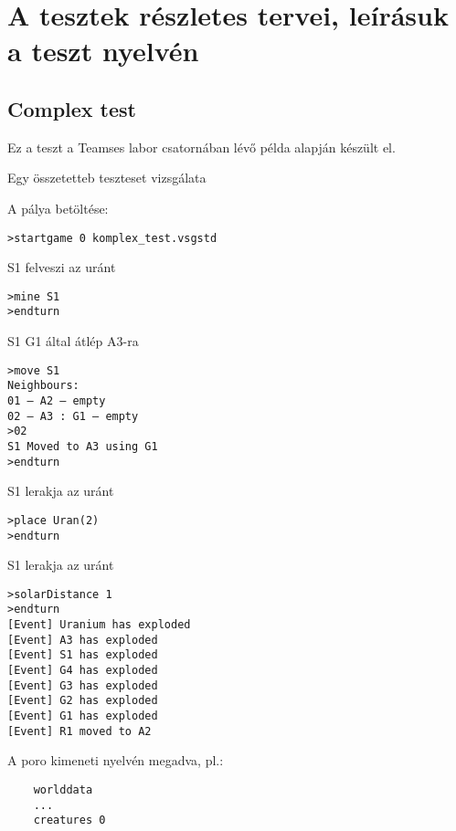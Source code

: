 \documentclass[../../projlab]{subfiles}
\begin{document}
\section{A tesztek részletes tervei, leírásuk a teszt nyelvén}

\subsection{Complex test}
\begin{test-case-description}
    Ez a teszt a Teamses labor csatornában lévő példa alapján készült el.
\end{test-case-description}
\begin{test-case-function}
    Egy összetetteb teszteset vizsgálata
\end{test-case-function}
\begin{test-case-input}
A pálya betöltése:
    \begin{verbatim}
>startgame 0 komplex_test.vsgstd
    \end{verbatim}

S1 felveszi az uránt
    \begin{verbatim}
>mine S1
>endturn
    \end{verbatim}

S1 G1 által átlép A3-ra
    \begin{verbatim}
>move S1
Neighbours:
01 – A2 – empty
02 – A3 : G1 – empty
>02
S1 Moved to A3 using G1
>endturn
    \end{verbatim}

S1 lerakja az uránt
    \begin{verbatim}
>place Uran(2)
>endturn        
    \end{verbatim}

S1 lerakja az uránt
    \begin{verbatim}
>solarDistance 1
>endturn
[Event] Uranium has exploded
[Event] A3 has exploded
[Event] S1 has exploded
[Event] G4 has exploded
[Event] G3 has exploded
[Event] G2 has exploded
[Event] G1 has exploded
[Event] R1 moved to A2        
    \end{verbatim}

\end{test-case-input}
\begin{test-case-output}
    A poro kimeneti nyelvén megadva, pl.:
    \begin{verbatim}
    worlddata
    ...
    creatures 0
    \end{verbatim}
\end{test-case-output}
\end{document}

